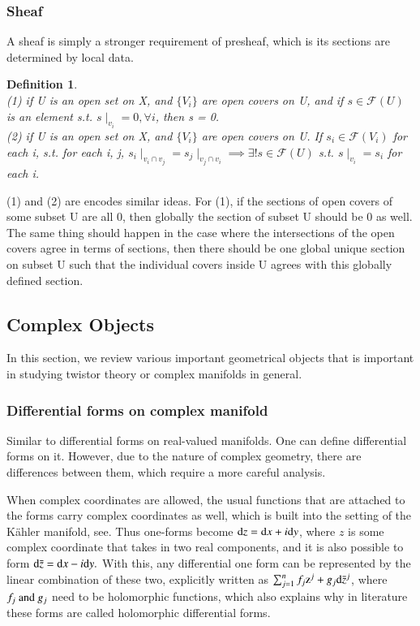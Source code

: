 \documentclass{article}
\newtheorem{definition}{Definition}
\begin{document}
\subsubsection{Sheaf}%
  \label{sub:Sheaf}
  A sheaf is simply a stronger requirement of presheaf, which is 
its sections are determined by local data.
\begin{definition}
  \leavevmode \\ 
  (1) if U is an open set on X, and $ \{ V_i \} $ are open covers on U, and if $ s \in \mathcal{F}(U)  $ is an element s.t. $ s
  \mid_{v_i} = 0, \forall i $, then s = 0. \\ 
  (2) if U is an open set on X, and $ \{ V_i \} $ are open covers on U. If $s_i \in \mathcal{F}(V_i)$ for each i, s.t. for each i, j,
  $ s_i \mid_{v_i \cap v_j} =  s_j \mid_{v_j \cap v_i} \implies \exists
  ! s \in \mathcal{F}(U) $ s.t. $s \mid_{v_i} = s_i$ for each i. 
\end{definition}

(1) and (2) are encodes similar ideas. For (1), if the sections of open covers
of some subset U are all 0, then globally the section of subset U should be 0
as well. The same thing should happen in the case where the
intersections of the open covers agree in terms of sections, then there
should be one global unique section on subset U such that the individual
covers inside U agrees with this globally defined section.  

\subsection{Complex Objects}%
  \label{sub: Complex Objects}
  In this section, we review various important geometrical objects that is
  important in studying twistor theory or complex manifolds in general.

  \subsubsection{Differential forms on complex manifold}%
    \label{sub: Differential forms on complex manifold}
    Similar to differential forms on real-valued manifolds. One can
    define differential forms on it. However, due to the nature of
    complex geometry, there are differences between them, which require
    a more careful analysis. 
    
    When complex coordinates are allowed, the usual functions that are
    attached to the forms carry complex coordinates as well, which is
    built into the setting of the Kähler manifold,
    see\cite{ballmann2006lectures}. Thus one-forms become $
    \textnormal{d}z = \textnormal{d}x + i \textnormal{d}y $, where $z$
    is some complex coordinate that takes in two real components, and it
    is also possible to form $ \textnormal{d} \bar z =
    \textnormal{d}x - i \textnormal{d}y. $ With this, any
    differential one form can be represented by the linear
    combination of these two, explicitly written as $
    \sum_{j=1}^{n} f_j \textnormal{z}^j + g_j \textnormal{d} \bar z^j $,
    where $f_j \textnormal{ and } g_j$ need to be holomorphic
    functions, which also explains why in literature these forms are
    called holomorphic differential forms. 
\end{document}

